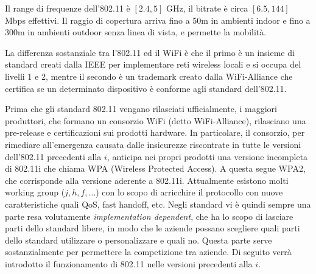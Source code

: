 Il range di frequenze dell'802.11 è $[2.4, 5]$ GHz, il bitrate è circa $[6.5, 144]$ Mbps effettivi. Il raggio di copertura arriva fino a 50m in ambienti indoor e fino a 300m in ambienti outdoor senza linea di vista, e permette la mobilità.

La differenza sostanziale tra l'802.11 ed il WiFi è che il primo è un insieme di standard creati dalla IEEE per implementare reti wireless locali e si occupa del livelli 1 e 2, mentre il secondo è un trademark creato dalla WiFi-Alliance che certifica se un determinato dispositivo è conforme agli standard dell'802.11.

Prima che gli standard 802.11 vengano rilasciati ufficialmente, i maggiori produttori, che formano un consorzio WiFi (detto WiFi-Alliance), rilasciano una pre-release e certificazioni sui prodotti hardware. In particolare, il consorzio, per rimediare all'emergenza causata dalle insicurezze riscontrate in tutte le versioni dell'802.11 precedenti alla $i$, anticipa nei propri prodotti una versione incompleta di 802.11i che chiama WPA (Wireless Protected Access). A questa segue WPA2, che corrisponde alla versione aderente a 802.11i. Attualmente esistono molti working group ($j,h,f,\dots$) con lo scopo di arricchire il protocollo con nuove caratteristiche quali QoS, fast handoff, etc. Negli standard vi è quindi sempre una parte resa volutamente \textit{implementation dependent}, che ha lo scopo di lasciare parti dello standard libere, in modo che le aziende possano scegliere quali parti dello standard utilizzare o personalizzare e quali no. Questa parte serve sostanzialmente per permettere la competizione tra aziende. Di seguito verrà introdotto il funzionamento di 802.11 nelle versioni precedenti alla $i$.\\

